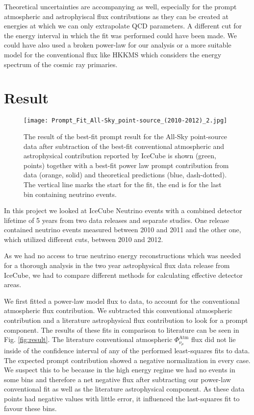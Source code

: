 \documentclass[%
 reprint,
 preprintnumbers,
 nofootinbib,
 amsmath,amssymb,
 aps,
]{revtex4-2}
\begin{document}
Theoretical uncertainties are accompanying as well, especially for the prompt atmospheric and astrophyiscal flux contributions as they can be created at energies at which we can only extrapolate QCD parameters. A different cut for the energy interval in which the fit was performed could have been made. We could have also used a broken power-law for our analysis or a more suitable model for the conventional flux like HKKMS which considers the energy spectrum of the cosmic ray primaries.

\section{\label{sec:level4}Result}

\begin{figure}[h]
\centering
\texttt{[image: Prompt\_Fit\_All-Sky\_point-source\_(2010-2012)\_2.jpg]}
\caption{\label{fig:Prompt} The result of the best-fit prompt result for the All-Sky point-source data after subtraction of the best-fit conventional atmospheric and astrophysical contribution reported by IceCube \cite{HESE2017} is shown (green, points) together with a best-fit power law prompt contribution from data (orange, solid) and theoretical predictions (blue, dash-dotted). The vertical line marks the start for the fit, the end is for the last bin containing neutrino events.}
\end{figure}

In this project we looked at IceCube Neutrino events with a combined detector lifetime of 5 years from two data releases and separate studies. One release contained neutrino events measured between 2010 and 2011 and the other one, which utilized different cuts, between 2010 and 2012.

As we had no access to true neutrino energy reconstructions which was needed for a thorough analysis in the two year astrophysical flux data release from IceCube, we had to compare different methods for calculating effective detector areas.

We first fitted a power-law model flux to data, to account for the conventional atmospheric flux contribution. We subtracted this conventional atmospheric contribution and a literature astrophysical flux contribution to look for a prompt component. The results of these fits in comparison to literature can be seen in Fig. \ref{fig:result}. The literature conventional atmospheric $\Phi_{\nu_\mu}^\text{Atm}$ flux did not lie inside of the confidence interval of any of the performed least-squares fits to data. The expected prompt contribution showed a negative normalization in every case. We suspect this to be because in the high energy regime we had no events in some bins and therefore a net negative flux after subtracting our power-law conventional fit as well as the literature astrophysical component. As these data points had negative values with little error, it influenced the last-squares fit to favour these bins. 
\end{document}
